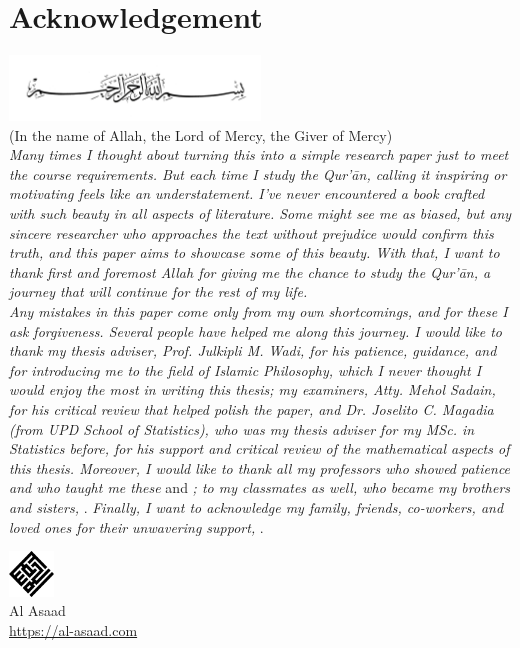 \chapter*{Acknowledgement}
{\centering
\includegraphics[width=0.5\textwidth]{img/bismillah.jpg}\\[-.2cm]
(In the name of Allah, the Lord of Mercy, the Giver of Mercy)\\[0.6cm]
}\textit{Many times I thought about turning this into a simple research paper just to meet the course requirements. But each time I study the Qur'\=an, calling it inspiring or motivating feels like an understatement. I've never encountered a book crafted with such beauty in all aspects of literature. Some might see me as biased, but any sincere researcher who approaches the text without prejudice would confirm this truth, and this paper aims to showcase some of this beauty. With that, I want to thank first and foremost Allah \textrm{} for giving me the chance to study the Qur'\=an, a journey that will continue for the rest of my life.}\\[0.3cm]
\indent\textit{Any mistakes in this paper come only from my own shortcomings, and for these I ask forgiveness. Several people have helped me along this journey. I would like to thank my thesis adviser, Prof. Julkipli M. Wadi, for his patience, guidance, and for introducing me to the field of Islamic Philosophy, which I never thought I would enjoy the most in writing this thesis; my examiners, Atty. Mehol Sadain, for his critical review that helped polish the paper, and Dr. Joselito C. Magadia (from UPD School of Statistics), who was my thesis adviser for my MSc. in Statistics before, for his support and critical review of the mathematical aspects of this thesis. Moreover, I would like to thank all my professors who showed patience and who taught me these}  and \textit{; to my classmates as well, who became my brothers and sisters,} . \textit{Finally, I want to acknowledge my family, friends, co-workers, and loved ones for their unwavering support,} .\\
\begin{center}
    \includegraphics[width=0.09\textwidth]{img/alasaad-logo.png}\\
    Al Asaad\\
    \url{https://al-asaad.com}\\[-0.5cm]
\end{center}
